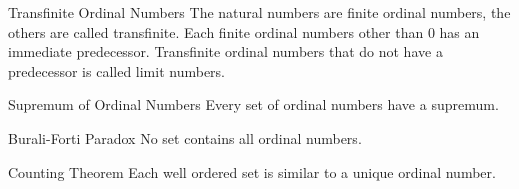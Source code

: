 \documentclass[a4paper]{article}
\begin{document}
\begin{thm}{Transfinite Ordinal Numbers}{} The natural numbers are finite ordinal numbers, the others are called transfinite. Each finite ordinal numbers other than $0$ has an immediate predecessor. Transfinite ordinal numbers that do not have a predecessor is called limit numbers. 
\end{thm}

\begin{thm}{Supremum of Ordinal Numbers}{} Every set of ordinal numbers have a supremum. 
\end{thm}

\begin{thm}{Burali-Forti Paradox}{} No set contains all ordinal numbers. 
\end{thm}

\begin{thm}{Counting Theorem}{} Each well ordered set is similar to a unique ordinal number. 
\end{thm}
\end{document}
